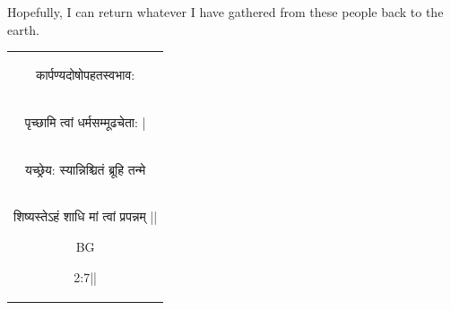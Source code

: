 \documentclass[hidelinks,11pt,a4paper]{report}
\begin{document}
Hopefully, I can return whatever I have gathered from these people back to the earth.
\clearpage

\begin{table}[th]
    \centering
    \begin{tabular}{c}
\begin{sanskrit}कार्पण्यदोषोपहतस्वभाव:\end{sanskrit}\\
\begin{sanskrit}पृच्छामि त्वां धर्मसम्मूढचेता: |\end{sanskrit}\\
\begin{sanskrit}यच्छ्रेय: स्यान्निश्चितं ब्रूहि तन्मे\end{sanskrit}\\
\begin{sanskrit}शिष्यस्तेऽहं शाधि मां त्वां प्रपन्नम् ||\end{sanskrit}BG \begin{sanskrit}2:7||\end{sanskrit}\\


\end{tabular}
\end{table}
\end{document}
